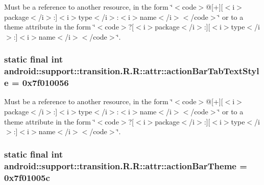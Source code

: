 Must be a reference to another resource, in the form \char`\"{}$<$code$>$@\mbox{[}+\mbox{]}\mbox{[}$<$i$>$package$<$/i$>$:\mbox{]}$<$i$>$type$<$/i$>$:$<$i$>$name$<$/i$>$$<$/code$>$\char`\"{} or to a theme attribute in the form \char`\"{}$<$code$>$?\mbox{[}$<$i$>$package$<$/i$>$:\mbox{]}\mbox{[}$<$i$>$type$<$/i$>$:\mbox{]}$<$i$>$name$<$/i$>$$<$/code$>$\char`\"{}. \hypertarget{classandroid_1_1support_1_1transition_1_1_r_1_1attr_276308635621dcd33865bc1163e29d6d}{
\subsubsection[{actionBarTabTextStyle}]{\setlength{\rightskip}{0pt plus 5cm}static final int android::support::transition.R.R::attr::actionBarTabTextStyle = 0x7f010056}}
\label{classandroid_1_1support_1_1transition_1_1_r_1_1attr_276308635621dcd33865bc1163e29d6d}


Must be a reference to another resource, in the form \char`\"{}$<$code$>$@\mbox{[}+\mbox{]}\mbox{[}$<$i$>$package$<$/i$>$:\mbox{]}$<$i$>$type$<$/i$>$:$<$i$>$name$<$/i$>$$<$/code$>$\char`\"{} or to a theme attribute in the form \char`\"{}$<$code$>$?\mbox{[}$<$i$>$package$<$/i$>$:\mbox{]}\mbox{[}$<$i$>$type$<$/i$>$:\mbox{]}$<$i$>$name$<$/i$>$$<$/code$>$\char`\"{}. \hypertarget{classandroid_1_1support_1_1transition_1_1_r_1_1attr_c8785381bb3ceebbe6e69636bcb6d58b}{
\subsubsection[{actionBarTheme}]{\setlength{\rightskip}{0pt plus 5cm}static final int android::support::transition.R.R::attr::actionBarTheme = 0x7f01005c}}
\label{classandroid_1_1support_1_1transition_1_1_r_1_1attr_c8785381bb3ceebbe6e69636bcb6d58b}


